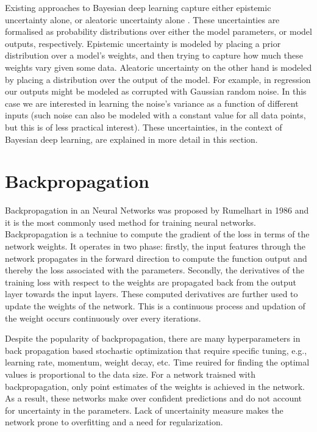 Existing approaches to Bayesian deep learning capture either epistemic uncertainty alone, or aleatoric uncertainty alone \cite{gal2016thesis}. These uncertainties are formalised as probability distributions over either the model parameters, or model outputs, respectively. Epistemic uncertainty is modeled by placing a prior distribution over a model's weights, and then trying to capture how much these weights vary given some data. Aleatoric uncertainty on the other hand is modeled by placing a distribution over the output of the model. For example, in regression our outputs might be modeled as corrupted with Gaussian random noise. In this case we are interested in learning the noise's variance as a function of different inputs (such noise can also be modeled with a constant value for all data points, but this is of less practical interest). These uncertainties, in the context of Bayesian deep learning, are explained in more detail in this section. 

\section{Backpropagation}

Backpropagation in an Neural Networks was proposed by Rumelhart \cite{Rumelhart} in 1986 and it is the most commonly used method for training neural networks. Backpropagation is a techniue to compute the gradient of the loss in terms of the network weights. It operates in two phase: firstly, the input features through the network propagates in the forward direction to compute the function output and thereby the loss associated with the parameters. Secondly, the derivatives of the training loss with respect to the weights
are propagated back from the output layer towards the input layers.
These computed derivatives are further used to update the weights of the network. This is a continuous process and updation of the weight occurs continuously over every iterations. 

Despite the popularity of backpropagation, there are many hyperparameters in back propagation based stochastic optimization
that require specific tuning, e.g., learning rate, momentum,
weight decay, etc. Time reuired for finding the optimal values is proportional to the data size. For a network traisned with backpropagation, only point estimates of the weights is achieved in the network. As a result, these networks make over confident predictions  and do not account for uncertainty in the parameters. Lack of uncertainity measure makes the network prone to overfitting and a need for regularization.

